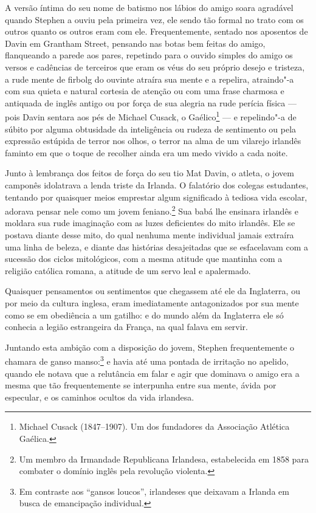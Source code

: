 A versão íntima do seu nome de batismo nos lábios do amigo soara
agradável quando Stephen a ouviu pela primeira vez, ele sendo tão
formal no trato com os outros quanto os outros eram com ele.
Frequentemente, sentado nos aposentos de Davin em Grantham Street,
pensando nas botas bem feitas do amigo, flanqueando a parede aos pares,
repetindo para o ouvido simples do amigo os versos e cadências de
terceiros que eram os véus do seu próprio desejo e tristeza, a rude
mente de firbolg do ouvinte atraíra sua mente e a repelira, atraindo"-a
com sua quieta e natural cortesia de atenção ou com uma frase charmosa
e antiquada de inglês antigo ou por força de sua alegria na rude
perícia física --- pois Davin sentara aos pés de Michael Cusack, o
Gaélico\footnote{ Michael Cusack (1847--1907). Um dos fundadores da
Associação Atlética Gaélica.} --- e repelindo"-a de súbito por alguma
obtusidade da inteligência ou rudeza de sentimento ou pela expressão
estúpida de terror nos olhos, o terror na alma de um vilarejo irlandês
faminto em que o toque de recolher ainda era um medo vivido a cada
noite.

Junto à lembrança dos feitos de força do seu tio Mat Davin, o
atleta, o jovem camponês idolatrava a lenda triste da Irlanda. O
falatório dos colegas estudantes, tentando por quaisquer meios
emprestar algum significado à tediosa vida escolar, adorava pensar nele
como um jovem feniano.\footnote{ Um membro da Irmandade Republicana
Irlandesa, estabelecida em 1858 para combater o domínio inglês pela
revolução violenta.} Sua babá lhe ensinara irlandês e moldara sua rude
imaginação com as luzes deficientes do mito irlandês. Ele se postava
diante desse mito, do qual nenhuma mente individual jamais extraíra uma
linha de beleza, e diante das histórias desajeitadas que se esfacelavam
com a sucessão dos ciclos mitológicos, com a mesma atitude que mantinha
com a religião católica romana, a atitude de um servo leal e
apalermado.

Quaisquer pensamentos ou sentimentos que chegassem até ele da Inglaterra,
ou por meio da cultura inglesa, eram imediatamente antagonizados por sua
mente como se em obediência a um gatilho: e do mundo além da Inglaterra
ele só conhecia a legião estrangeira da França, na qual falava em
servir.

Juntando esta ambição com a disposição do jovem, Stephen frequentemente
o chamara de ganso manso:\footnote{ Em contraste aos “gansos loucos”,
irlandeses que deixavam a Irlanda em busca de emancipação individual.}
e havia até uma pontada de irritação no apelido, quando ele notava que
a relutância em falar e agir que dominava o amigo era a mesma que tão
frequentemente se interpunha entre sua mente, ávida por especular, e os
caminhos ocultos da vida irlandesa.

